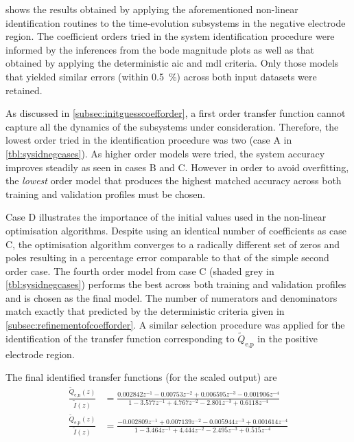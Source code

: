 

   shows   the   results  obtained   by   applying   the
aforementioned   non-linear  identification   routines  to   the  time-evolution
subsystems in the negative electrode region. The coefficient orders tried in the
system identification  procedure were informed  by the inferences from  the bode
magnitude plots as well as that obtained by applying the deterministic \gls{aic}
and \gls{mdl}  criteria. Only those  models that yielded similar  errors (within
\SI{0.5}{\percent}) across both input datasets were retained.

As  discussed  in \cref{subsec:initguesscoefforder},   a  first  order  transfer
function cannot capture all the  dynamics of the subsystems under consideration.
Therefore, the lowest order tried in  the identification procedure was two (case
A in \cref{tbl:sysidnegcases}).  As higher order  models were tried,  the system
accuracy improves steadily as  seen in cases B and C. However  in order to avoid
overfitting, the  \emph{lowest} order  model that  produces the  highest matched
accuracy across both training and validation profiles must be chosen.

Case D illustrates  the importance of the initial values  used in the non-linear
optimisation algorithms.  Despite using an  identical number of  coefficients as
case C,  the optimisation algorithm  converges to  a radically different  set of
zeros  and  poles  resulting  in  a  percentage  error  comparable  to  that  of
the  simple second  order  case. The  fourth  order model  from  case C  (shaded
grey  in \cref{tbl:sysidnegcases}) performs  the best  across both  training and
validation profiles and  is chosen as the final model.  The number of numerators
and  denominators match  exactly that  predicted by  the deterministic  criteria
given in \cref{subsec:refinementofcoefforder}. A similar selection procedure was
applied  for  the  identification  of the  transfer  function  corresponding  to
$\widetilde{Q}_{\text{e,p}}$ in the positive electrode region.

The final identified transfer functions (for the scaled output) are
\begin{align}
    \frac{\widetilde{Q}_{\text{e,n}}(z)}{\widetilde{I}(z)} & = \frac{0.002842 z^{-1} - 0.00753 z^{-2} + 0.006595 z^{-3} - 0.001906 z^{-4}}{1 - 3.577 z^{-1} + 4.767 z^{-2} - 2.801 z^{-3} + 0.6118 z^{-4}} \label{eq:finaldisctfneg}\\
    \frac{\widetilde{Q}_{\text{e,p}}(z)}{\widetilde{I}(z)} & = \frac{-0.002809 z^{-1} + 0.007139 z^{-2} - 0.005944 z^{-3} + 0.001614 z^{-4}}{1 - 3.464 z^{-1} + 4.444 z^{-2} - 2.495 z^{-3} + 0.515 z^{-4}}\label{eq:finaldisctfpos}
\end{align}

